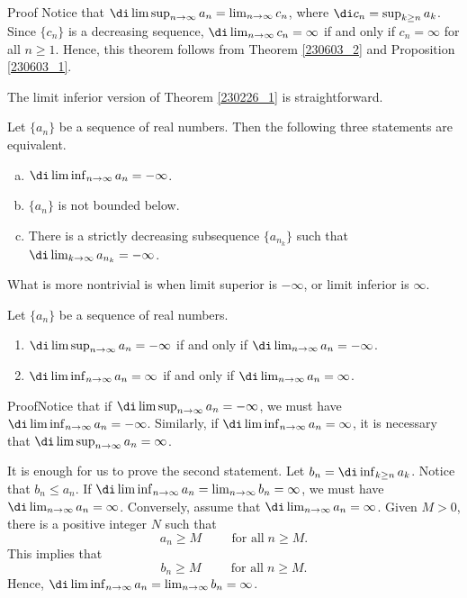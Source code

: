 \begin{myproof}
{Proof}
Notice that $\di\limsup_{n\to\infty}a_n= \lim_{n\to \infty}c_n$, where $\di c_n=\sup_{k\geq n}a_k$. Since $\{c_n\}$ is a decreasing sequence, $\di\lim_{n\to \infty}c_n=\infty$ if and only if $c_n=\infty$ for all $n\geq 1$. Hence, this theorem  follows  from Theorem \ref{230603_2} and Proposition \ref{230603_1}. 
 


\end{myproof}
 
The limit inferior  version of Theorem \ref{230226_1} is straightforward.
\begin{theorem}[label=230226_2]{}
Let $\{a_n\}$ be a sequence of real numbers. Then the following three statements are equivalent.
\begin{enumerate}[(a)]
\item $\di\liminf_{n\to\infty}a_n=-\infty$.
\item $\{a_n\}$ is not bounded below.
\item  There is a strictly decreasing subsequence $\{a_{n_k}\}$ such that $\di\lim_{k\to\infty}a_{n_k}=-\infty$.


\end{enumerate}
\end{theorem}

What is more nontrivial is when  limit superior is $-\infty$, or limit inferior is $\infty$.

\begin{theorem}[label=230226_3]{}
Let $\{a_n\}$ be a sequence of real numbers.
\begin{enumerate}[1.]
\item
$\di\limsup_{n\to\infty}a_n=-\infty$ if and only if   $\di\lim_{n\to\infty}a_n=-\infty$.
\item $\di\liminf_{n\to\infty}a_n= \infty$ if and only if  $\di\lim_{n\to\infty}a_n= \infty$.
\end{enumerate}
\end{theorem}

\begin{myproof}{Proof}Notice that if $\di\limsup_{n\to\infty}a_n=-\infty$, we must have $\di\liminf_{n\to\infty}a_n=-\infty$. Similarly, if $\di\liminf_{n\to\infty}a_n= \infty$, it is necessary that $\di\limsup_{n\to\infty}a_n= \infty$.

It is enough for us to prove the second statement. 
Let $b_n=\di\inf_{k\geq n }a_k$. Notice that $b_n\leq a_n$. If 
 $\di\liminf_{n\to\infty}a_n= \lim_{n\to\infty}b_n=\infty$, we must have
$\di\lim_{n\to\infty}a_n=\infty$.  Conversely, assume that $\di\lim_{n\to\infty}a_n=\infty$. Given $M>0$, there is a positive integer $N$ such that 
\[a_n\geq M\hspace{1cm}\text{for all}\;n\geq M.\]
This implies that
\[b_n\geq M\hspace{1cm}\text{for all}\;n\geq M.\] Hence, $\di\liminf_{n\to\infty} a_n=\lim_{n\to\infty}b_n=\infty$.
 

\end{myproof}


